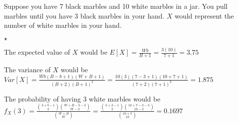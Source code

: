 \documentclass[12pt]{article}
\begin{document}
Suppose you have 7 black marbles and 10 white marbles in a jar.  You pull marbles until you have 3 black marbles in your hand.  $X$ would represent the number of white marbles in your hand.
\begin{list}{$\star$ }{}
\item The expected value of $X$ would be $E[X] = \frac{Wb}{B+1} = \frac{3(10)}{7+1} = 3.75$
\item The variance of $X$ would be $Var[X] = \frac{Wb(B-b+1)(W+B+1)}{(B+2)(B+1)^2} = \frac{10(3)(7-3+1)(10+7+1)}{(7+2)(7+1)^2} = 1.875$
\item The probability of having 3 white marbles would be $f_X(3) = \frac{{3+b-1 \choose 3}{W+B-b-3 \choose W-3}}{{W+B \choose W}} = \frac{{3+3-1 \choose 3}{10+7-3-3 \choose 10-3}}{{10+7 \choose 10}} = 0.1697$
\end{list}
\end{document}
